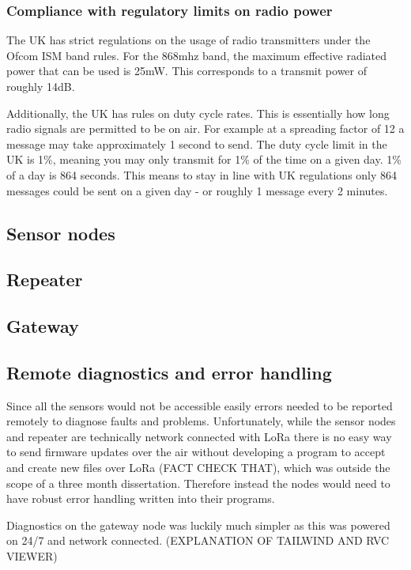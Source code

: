 \subsubsection{Compliance with regulatory limits on radio power}

The UK has strict regulations on the usage of radio transmitters under the Ofcom
ISM band rules. For the 868mhz band, the maximum effective radiated power that
can be used is 25mW. This corresponds to a transmit power of roughly 14dB.

Additionally, the UK has rules on duty cycle rates. This is essentially how long
radio signals are permitted to be on air. For example at a spreading factor of
12 a message may take approximately 1 second to send. The duty cycle limit in
the UK is 1\%, meaning you may only transmit for 1\% of the time on a given day.
1\% of a day is 864 seconds. This means to stay in line with UK regulations only
864 messages could be sent on a given day - or roughly 1 message every 2
minutes.


\subsection{Sensor nodes}

\subsection{Repeater}

\subsection{Gateway}

\subsection{Remote diagnostics and error handling}

Since all the sensors would not be accessible easily errors needed to be
reported remotely to diagnose faults and problems. Unfortunately, while the
sensor nodes and repeater are technically network connected with LoRa there is
no easy way to send firmware updates over the air without developing a program
to accept and create new files over LoRa (FACT CHECK THAT), which was outside
the scope of a three month dissertation. Therefore instead the nodes would need
to have robust error handling written into their programs.

Diagnostics on the gateway node was luckily much simpler as this was powered on
24/7 and network connected. (EXPLANATION OF TAILWIND AND RVC VIEWER)
